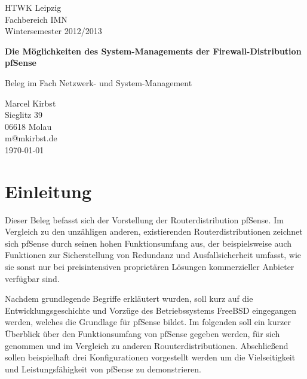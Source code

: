\documentclass[a4paper,12pt]{scrartcl}
\begin{document}
\begin{titlepage}
\begin{small}
\vfill {HTWK Leipzig\\ 
Fachbereich IMN \\ 
Wintersemester 2012/2013}
\end{small}


\begin{center}
\begin{Large}
\vfill {\textsf{\textbf{
Die Möglichkeiten des System-Managements der Firewall-Distribution pfSense\\
}}}
\end{Large}
Beleg im Fach Netzwerk- und System-Management
\end{center}

\begin{small}
\vfill Marcel Kirbst \\ Sieglitz 39 \\  06618 Molau \\  m@mkirbst.de\\ 
\today
\end{small}

\end{titlepage}


\tableofcontents
\thispagestyle{empty}

\clearpage

\onehalfspacing

\pagestyle{plain}


\section{Einleitung}
Dieser Beleg befasst sich der Vorstellung der Routerdistribution pfSense.
Im Vergleich zu den unzähligen anderen, existierenden Routerdistributionen
zeichnet sich pfSense durch seinen hohen Funktionsumfang aus, der beispielsweise
auch Funktionen zur Sicherstellung von Redundanz und Ausfallsicherheit umfasst,
wie sie sonst nur bei preisintensiven proprietären Lösungen kommerzieller
Anbieter verfügbar sind.


Nachdem grundlegende Begriffe erkläutert wurden, soll kurz auf die Entwicklungsgeschichte und Vorzüge des Betriebssystems FreeBSD eingegangen werden, welches die Grundlage für pfSense bildet. Im folgenden soll ein kurzer Überblick über den Funktionsumfang von pfSense gegeben werden, für sich genommen und im Vergleich zu anderen Rouuterdistributionen. Abschließend sollen beispielhaft drei Konfigurationen vorgestellt werden um die Vielseitigkeit und Leistungsfähigkeit von pfSense zu demonstrieren.
\end{document}
